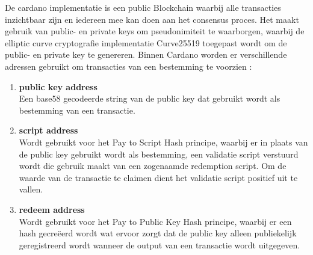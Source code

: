 De cardano implementatie is een public Blockchain waarbij alle transacties inzichtbaar zijn en iedereen mee kan doen aan het consensus proces. Het maakt gebruik van public- en private keys om pseudonimiteit te waarborgen, waarbij de elliptic curve cryptografie implementatie Curve25519 toegepast wordt om de public- en private key te genereren. Binnen Cardano worden er verschillende adressen gebruikt om transacties van een bestemming te voorzien \citep[''Addresses in Cardano SL'']{cardano_wiki}:

\begin{enumerate}
  \item \textbf{public key address}
  \\ Een base58 gecodeerde string van de public key dat gebruikt wordt als bestemming van een transactie.
  \item \textbf{script address}
  \\ Wordt gebruikt voor het Pay to Script Hash principe, waarbij er in plaats van de public key gebruikt wordt als bestemming, een validatie script verstuurd wordt die gebruik maakt van een zogenaamde redemption script. Om de waarde van de transactie te claimen dient het validatie script positief uit te vallen.
  \item \textbf{redeem address}
  \\ Wordt gebruikt voor het Pay to Public Key Hash principe, waarbij er een hash gecreëerd wordt wat ervoor zorgt dat de public key alleen publiekelijk geregistreerd wordt wanneer de output van een transactie wordt uitgegeven.
\end{enumerate}



